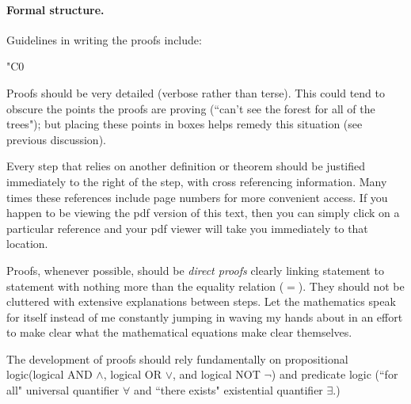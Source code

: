   \paragraph{Formal structure.}
  Guidelines in writing the proofs include:
  \begin{dingautolist}{"C0}
    \item Proofs should be very detailed (verbose rather than terse).
          This could tend to obscure the points the proofs are proving
          (``can't see the forest for all of the trees");
          but placing these points in boxes helps remedy this situation
          (see previous discussion).
    \item Every step that relies on another definition or theorem
          should be justified immediately to the right of the step,
          with cross referencing information.
          Many times these references include page numbers for more convenient access.
          If you happen to be viewing the pdf version of this text,
          then you can simply click on a particular reference and your pdf viewer will
          take you immediately to that location.
    \item Proofs, whenever possible, should be {\em direct proofs}
          clearly linking statement to statement with nothing more than
          the equality relation ($=$).
          They should not be cluttered with extensive explanations
          between steps. Let the mathematics speak for itself instead
          of me constantly jumping in waving my hands about in an effort to
          make clear what the mathematical equations make clear
          themselves.
    \item The development of proofs should rely fundamentally on
          propositional logic(logical AND $\land$, logical OR $\lor$, and logical NOT $\lnot$)
          and predicate logic (``for all" universal quantifier $\forall$ and
          ``there exists" existential quantifier $\exists$.)
  \end{dingautolist}





